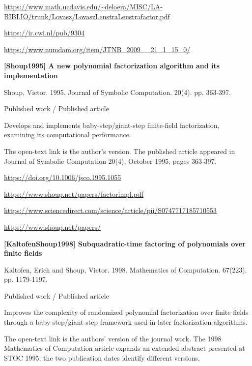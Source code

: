 \documentclass[11pt,a4paper,oneside,openany]{book}
\begin{document}
{\footnotesize\url{https://www.math.ucdavis.edu/~deloera/MISC/LA-BIBLIO/trunk/Lovasz/LovaszLenstraLenstrafactor.pdf}}\par
{\footnotesize\url{https://ir.cwi.nl/pub/9304}}\par
{\footnotesize\url{https://www.numdam.org/item/JTNB_2009__21_1_15_0/}}\par
\vspace{9pt}
\hypertarget{ref:Shoup1995}{}
{\sffamily\bfseries\color{atlasgreen}[Shoup1995] A new polynomial factorization algorithm and its implementation}\par
\color{black} Shoup, Victor. 1995. Journal of Symbolic Computation. 20(4). pp. 363-397.\par
{\small\sffamily\color{atlasgold}Published work / Published article}\par
\color{black} Develops and implements baby-step/giant-step finite-field factorization, examining its computational performance.\par
{\small The open-text link is the author's version. The published article appeared in Journal of Symbolic Computation 20(4), October 1995, pages 363-397.}\par
{\footnotesize\url{https://doi.org/10.1006/jsco.1995.1055}}\par
{\footnotesize\url{https://www.shoup.net/papers/factorimpl.pdf}}\par
{\footnotesize\url{https://www.sciencedirect.com/science/article/pii/S0747717185710553}}\par
{\footnotesize\url{https://www.shoup.net/papers/}}\par
\vspace{9pt}
\hypertarget{ref:KaltofenShoup1998}{}
{\sffamily\bfseries\color{atlasgreen}[KaltofenShoup1998] Subquadratic-time factoring of polynomials over finite fields}\par
\color{black} Kaltofen, Erich and Shoup, Victor. 1998. Mathematics of Computation. 67(223). pp. 1179-1197.\par
{\small\sffamily\color{atlasgold}Published work / Published article}\par
\color{black} Improves the complexity of randomized polynomial factorization over finite fields through a baby-step/giant-step framework used in later factorization algorithms.\par
{\small The open-text link is the authors' version of the journal work. The 1998 Mathematics of Computation article expands an extended abstract presented at STOC 1995; the two publication dates identify different versions.}\par
\end{document}
